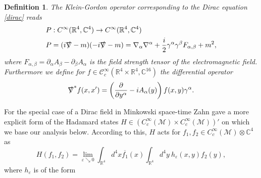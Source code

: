 \documentclass[b5paper,draft,openbib,12pt]{memoir}
\newtheorem{Def}{Definition}
\begin{document}
\begin{Def}
The Klein-Gordon operator corresponding to the Dirac equation \eqref{dirac} reads
\begin{align}
&P: C^\infty(\mathbb{R}^4,\mathbb{C}^4)\rightarrow C^\infty(\mathbb{R}^4,\mathbb{C}^4)\\
&P=(i\slashed{\nabla}-m)(-i\slashed{\nabla}-m)=\nabla_\alpha \nabla^\alpha + \frac{i}{2} \gamma^\alpha \gamma^\beta F_{\alpha,\beta} +m^2,
\end{align}
where \(F_{\alpha,\beta}=\partial_\alpha A_\beta - \partial_\beta A_\alpha\) is the field strength tensor of the electromagnetic field. Furthermore we 
define for \(f\in \mathcal{C}_c^\infty(\mathbb{R}^4\times \mathbb{R}^4,\mathbb{C}^{16})\) the differential operator
\begin{equation}
\slashed{\nabla}^* f(x,x')=\left(\frac{\partial}{\partial y^\alpha} - i A_\alpha(y)\right)f(x,y)\gamma^\alpha.
\end{equation}
\end{Def}


For the special case of a Dirac field in Minkowski space-time Zahn \cite{schlemmer2015current} gave a more explicit form of
the Hadamard states \(H \in (C_c^\infty(\mathcal{M})\times C_c^\infty(\mathcal{M}))'\)  on which we base our analysis below.
According to this, \(H\) 
acts for \(f_1,f_2\in C_c^\infty(\mathcal{M})\otimes \mathbb{C}^4\) as 
\begin{equation}\label{eq:hadamard1}
H(f_1,f_2)=\lim_{\varepsilon\searrow 0} \int_{\mathbb{R}^4}d^4 x \overline{f_1}(x) \int_{\mathbb{R}^4} d^4y ~h_\varepsilon(x,y) f_2(y),
\end{equation}
where \(h_\varepsilon\) is of the form
\end{document}
